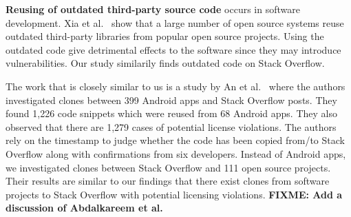 \documentclass[10pt,journal,compsoc]{IEEEtran}
\newcommand\FIXME[1]{{\color{red}\textbf{FIXME: #1}}}
\begin{document}
\textbf{Reusing of outdated third-party source code} occurs 
in software development. Xia et al.~\cite{Xia2014} show that 
a large number of open source systems reuse outdated third-party 
libraries from popular open source projects. Using the outdated 
code give detrimental effects to the software since they may 
introduce vulnerabilities. Our study similarily finds
outdated code on Stack Overflow.

The work that is closely similar to us is a study by 
An et al.~\cite{An2017} where the authors investigated 
clones between 399 Android apps and Stack Overflow posts. 
They found 1,226 code snippets which were reused from 68 Android apps. 
They also observed that there are 1,279 cases of potential 
license violations. The authors rely on the timestamp to 
judge whether the code has been copied from/to Stack Overflow 
along with confirmations from six developers. Instead of Android apps, 
we investigated clones between Stack Overflow and 111 open 
source projects. Their results are similar to our findings that 
there exist clones from software projects to Stack Overflow with 
potential licensing violations. 
\FIXME{Add a discussion of Abdalkareem et al.~\cite{Abdalkareem2017}}

%
\end{document}
